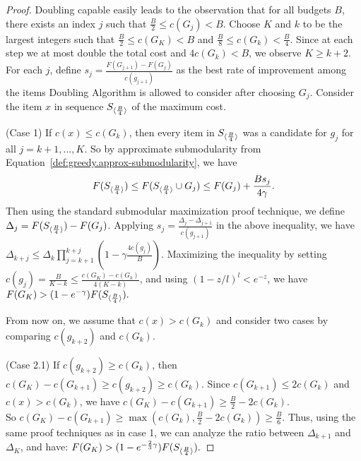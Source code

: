 \begin{proof}
Doubling capable easily leads to the observation that for all budgets $B$, there exists an index $j$ such that
$\frac{B}{2} \leq c(G_j) < B$.
Choose $K$ and $k$ to be  the largest integers such that
$\frac{B}{2} \leq c(G_K) < B$ and 
$\frac{B}{8} \leq c(G_k) < \frac{B}{4}$. Since at each step we at most double the 
total cost and $4c(G_k) < B$, we observe $K \geq k+2$. 
For each $j$, define $s_j = \frac{F(G_{j+1}) - F(G_{j})}{c(g_{j+1})}$ as the best 
rate of improvement among the items Doubling Algorithm is allowed to consider
after choosing $G_j$. 
Consider the item $x$ in sequence $S_{\langle \frac{B}{4} \rangle}$ of the maximum cost. 

(Case 1) If $c(x) \leq c(G_k)$, then
every item in $S_{\langle \frac{B}{4} \rangle}$ was a candidate for $g_{j}$ for all $j=k+1,..., K$. 
So by approximate submodularity from Equation~\ref{def:greedy.approx-submodularity}, we have 
\begin{align}
\label{eq:sub-additive}
F(S_{\langle \frac{B}{4} \rangle}) \leq F(S_{\langle \frac{B}{4} \rangle} \cup G_{j}) \leq F(G_j) + \frac{B s_j}{4 \gamma}.
\end{align}
Then using the standard submodular maximization proof technique, we define
\mbox{$\Delta _j = F(S_{\langle \frac{B}{4} \rangle}) - F(G_j)$}. Applying $s_j = \frac{\Delta _{j} - \Delta_{j+1}}{c(g_{j+1})}$ in the above inequality, 
we have
\mbox{$\Delta _{k+j} \leq \Delta_k \prod _{j=k+1}^{k+j} ( 1 - \gamma \frac{ 4 c(g_{j})}{B})$}. Maximizing the 
inequality by setting $c(g_{j}) = \frac{B}{K-k} \leq \frac{c(G_K) - c(G_k)}{4 (K-k)}$, 
and using $(1- z/l)^l < e^{-z}$, we have 
\mbox{$F(G_K) > (1 - e^{-\gamma}) F(S_{\langle \frac{B}{4} \rangle}).
$}

From now on, we assume that $c(x) > c(G_k)$ and consider 
two cases by comparing $c(g_{k+2})$ and $c(G_{k})$. 

(Case 2.1) If $c(g_{k+2}) \geq c(G_{k})$, then 
$c(G_K) - c(G_{k+1}) \geq c(g_{k+2}) \geq c(G_k)$. 
Since $c(G_{k+1}) \leq 2 c(G_k)$ and $c(x) > c(G_k)$, 
we have $c(G_K) - c(G_{k+1}) \geq \frac{B}{2} - 2c(G_k)$. \\
So \mbox{$c(G_K) - c(G_{k+1}) \geq \max ( c(G_k), \frac{B}{2} - 2c(G_k) ) \geq \frac{B}{6}$}. 
Thus, using the same proof techniques as in case 1, we can analyze the ratio between $\Delta_{k+1}$ and $\Delta_K$, and have:
\mbox{$
F(G_K) > (1 - e^{-\frac{2}{3} \gamma}) F(S_{\langle \frac{B}{4} \rangle}).
$}


\end{proof}

